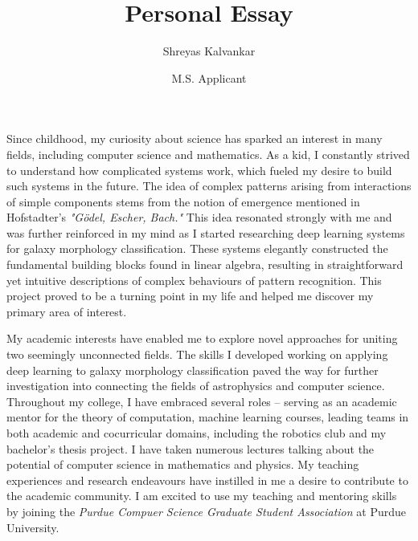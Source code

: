 \documentclass[12pt]{article}
\title{Personal Essay}
\author{Shreyas Kalvankar}
\date{M.S. Applicant}
\begin{document}
  \maketitle%
  \thispagestyle{empty}

\vspace{5pt}

Since childhood, my curiosity about science has sparked an
interest in many fields, including computer science and mathematics. As a kid, I
constantly strived to understand how complicated systems work, which fueled my
desire to build such systems in the future. The idea of complex patterns arising
from interactions of simple components stems from the notion of emergence
mentioned in Hofstadter’s \textit{"Gödel, Escher, Bach."} This idea resonated strongly
with me and was further reinforced in my mind as I started researching deep
learning systems for galaxy morphology classification. These systems elegantly
constructed the fundamental building blocks found in linear algebra, resulting
in straightforward yet intuitive descriptions of complex behaviours of pattern
recognition. This project proved to be a turning point in my life and helped me
discover my primary area of interest.

My academic interests have enabled me to explore novel approaches for uniting
two seemingly unconnected fields. The skills I developed working on applying
deep learning to galaxy morphology classification paved the way for further
investigation into connecting the fields of astrophysics and computer science.
Throughout my college, I have embraced several roles -- serving as an academic
mentor for the theory of computation, machine learning courses, leading teams in
both academic and cocurricular domains, including the robotics club and my
bachelor’s thesis project. I have taken numerous lectures talking about the
potential of computer science in mathematics and physics. My teaching
experiences and research endeavours have instilled in me a desire to contribute
to the academic community. I am excited to use my teaching and mentoring skills
by joining the \textit{Purdue Compuer Science Graduate Student Association} at Purdue
University.
\end{document}

